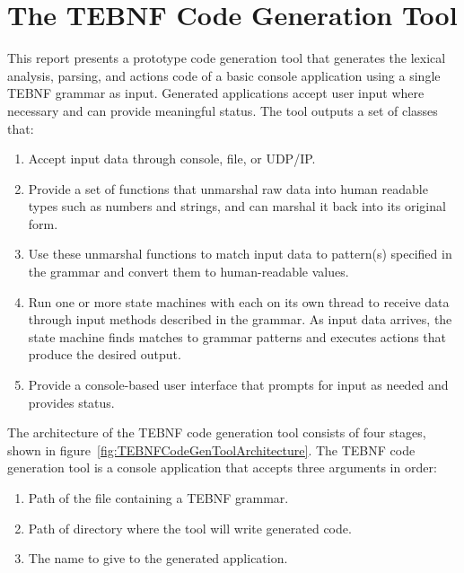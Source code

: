 \section{The TEBNF Code Generation Tool}
This report presents a prototype code generation tool that generates the lexical analysis, parsing, and actions code of a basic console application using a single TEBNF grammar as input.  Generated applications accept user input where necessary and can provide meaningful status.  The tool outputs a set of classes that:
\begin{enumerate}
  \item Accept input data through console, file, or UDP/IP.
  \item Provide a set of functions that unmarshal raw data into human readable types such as numbers and strings, and can marshal it back into its original form.
  \item Use these unmarshal functions to match input data to pattern(s) specified in the grammar and convert them to human-readable values.
  \item Run one or more state machines with each on its own thread to receive data through input methods described in the grammar.  As input data arrives, the state machine finds matches to grammar patterns and executes actions that produce the desired output.
  \item Provide a console-based user interface that prompts for input as needed and provides status.
\end{enumerate}

\indent
The architecture of the TEBNF code generation tool consists of four stages, shown in figure~\ref{fig:TEBNFCodeGenToolArchitecture}.  The TEBNF code generation tool is a console application that accepts three arguments in order:
\begin{enumerate}
  \item Path of the file containing a TEBNF grammar.
  \item Path of directory where the tool will write generated code.
  \item The name to give to the generated application.
\end{enumerate}

